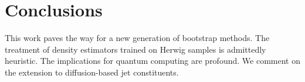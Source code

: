 \section{Conclusions}\label{sec:conclusions}

This work paves the way for a new generation of bootstrap methods. The
treatment of density estimators trained on Herwig samples is admittedly
heuristic. The implications for quantum computing are profound. We
comment on the extension to diffusion-based jet constituents.

